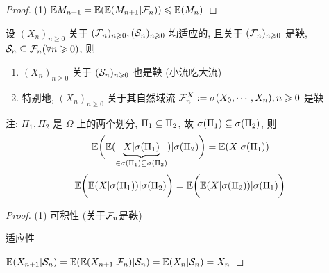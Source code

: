 \begin{proof}
    (1) $\mathbb E M_{n+1}=\mathbb E(\mathbb E(M_{n+1}|\mathcal{F}_n))\leqslant \mathbb E(M_n)$
\end{proof}

\begin{theorem}
    设 $(X_n)_{n\geq 0}$ 关于 $(\mathcal{F}_n)_{n\geqslant 0}, (\mathcal{S}_n)_{n\geqslant 0}$ 均适应的, 且关于 $(\mathcal{F}_n)_{n\geqslant 0}$ 是鞅, $\mathcal{S}_n\subseteq \mathcal{F}_n (\forall n\geqslant 0)$, 则
    \begin{enumerate}
        \item $(X_n)_{n\geq 0}$ 关于 $(\mathcal{S}_n)_{n\geqslant 0}$ 也是鞅 (小流吃大流)
        \item 特别地, $(X_n)_{n\geq 0}$ 关于其自然域流 $\mathcal{F}_n^X:=\sigma(X_0,\cdots,X_n), n\geqslant 0$ 是鞅 
    \end{enumerate}
\end{theorem}

注: $\Pi_1,\Pi_2$ 是 $\Omega$ 上的两个划分, $\Pi_1\subseteq \Pi_2$, 故 $\sigma(\Pi_1)\subseteq \sigma(\Pi_2)$, 则
\[
\mathbb E\bigg(
    \mathbb E(
        \underbrace{X|\sigma(\Pi_1)}_{\in \sigma(\Pi_1)\subseteq \sigma(\Pi_2)}
    )| \sigma(\Pi_2)
\bigg)=\mathbb E(X|\sigma(\Pi_1))
\]
\[
\mathbb E\bigg(
    \mathbb E(
        X|\sigma(\Pi_1)
    )| \sigma(\Pi_2)
\bigg)=
\mathbb E\bigg(
    \mathbb E(
        X|\sigma(\Pi_2)
    )| \sigma(\Pi_1)
\bigg)
\]
\begin{proof}
    (1) 可积性 (关于$\mathcal{F}_n$是鞅)

    适应性

    $\mathbb E(X_{n+1}|\mathcal{S}_n)=\mathbb E(\mathbb E(X_{n+1}|\mathcal{F}_n)|\mathcal{S}_n)=\mathbb E(X_n|\mathcal{S}_n)=X_n$
\end{proof}